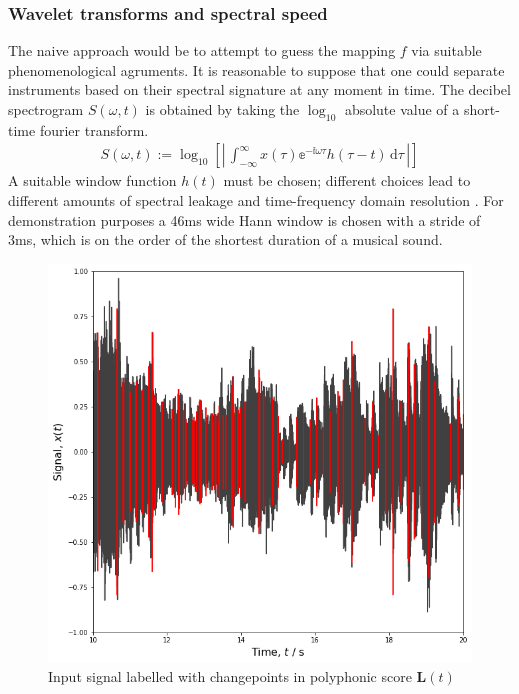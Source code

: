 \documentclass{article}[12pt]
\numberwithin{equation}{section}
\begin{document}
\subsubsection{Wavelet transforms and spectral speed}
The naive approach would be to attempt to guess the mapping $f$ via suitable
phenomenological agruments. It is reasonable to suppose that one could separate
instruments based on their spectral signature at any moment in time. The decibel
spectrogram $S(\omega,t)$ is obtained by taking the $\log_{10}$ absolute value
of a short-time fourier transform.
\begin{align}
	S(\omega,t):=\log_{10}\left[\left|\,
	\int_{-\infty}^{\infty}\!
		x(\tau)\mathbb{e}^{-\mathbb{i}\omega \tau}h(\tau-t)
	\,\mathrm{d}\tau
	\,\right|\right]
\end{align}
A suitable window function $h(t)$ must be chosen; different choices lead to
different amounts of spectral leakage and time-frequency domain resolution
\cite{}. For demonstration purposes a 46ms wide Hann window is chosen with a
stride of 3ms, which is on the order of the shortest duration of a musical
sound.
\begin{figure}[H]
\centering{}
\captionsetup{justification=centering}
\includegraphics[scale=0.5]{signal}
\caption{
Input signal labelled with changepoints in polyphonic score $\mathbf{L}(t)$}
\label{fig:signal}
\end{figure}
\end{document}
